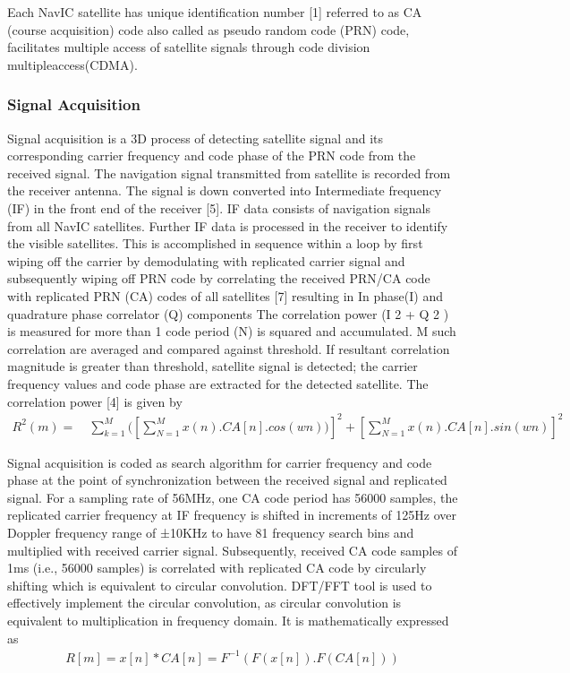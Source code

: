 \documentclass[10pt, onecolumn]{article}
\begin{document}
\begin{enumerate}
Each NavIC satellite has unique identification number [1] referred to as CA (course acquisition) code also called as pseudo random code (PRN) code, facilitates multiple access of satellite signals through code division multipleaccess(CDMA).\\

\subsubsection{Signal Acquisition}

Signal acquisition is a 3D process of detecting satellite signal and its corresponding carrier frequency and code phase of the PRN code from the received signal. The navigation signal transmitted from satellite is recorded from the receiver antenna. The signal is down converted into Intermediate frequency (IF) in the front end of the receiver [5]. IF data consists of navigation signals from all NavIC satellites.
Further IF data is processed in the receiver to identify the visible satellites. This is accomplished in sequence within a loop by first wiping off the carrier by demodulating with replicated carrier signal and subsequently wiping off PRN code by correlating the received PRN/CA code with replicated PRN (CA) codes of all satellites [7] resulting in In phase(I) and quadrature phase correlator (Q) components
The correlation power (I 2 + Q 2 ) is measured for more than 1 code period (N) is squared and accumulated. M such correlation are averaged and compared against threshold. If resultant correlation magnitude is greater than threshold, satellite signal is detected; the carrier frequency values and
code phase are extracted for the detected satellite. The correlation power [4] is given by
\begin{align}
R^2(m)=\quad\sum_{k=1}^M([\sum_{N=1}^M x(n).CA[n].cos(wn))]^2 + [\sum_{N=1}^M x(n).CA[n].sin(wn)]^2
\end{align}

Signal acquisition is coded as search algorithm for carrier frequency and code phase at the point of synchronization between the received signal and replicated signal. For a sampling rate of 56MHz, one CA code period has 56000 samples, the replicated carrier frequency at IF frequency is
shifted in increments of 125Hz over Doppler frequency range of ±10KHz to have 81 frequency search bins and multiplied with received carrier signal. Subsequently, received CA code samples of 1ms (i.e., 56000 samples) is correlated with replicated CA code by circularly shifting which is equivalent to circular convolution. 
DFT/FFT tool is used to effectively implement the circular convolution, as circular convolution is equivalent to multiplication in frequency domain. It is mathematically expressed as\\
\begin{align}
R[m]=x[n]*CA[n]=F^{-1}(F(x[n]).F(CA[n]))
\end{align}


\end{enumerate}
\end{document}
